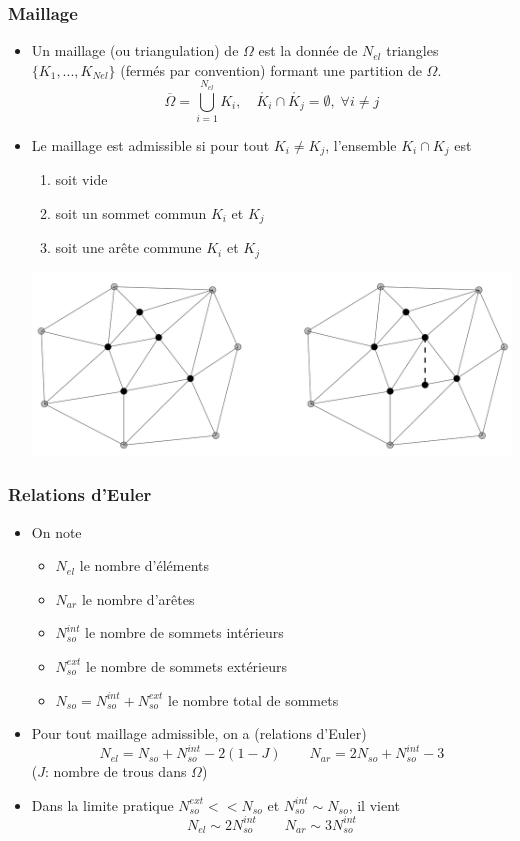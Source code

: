 \documentclass{beamer}
\begin{document}
\begin{frame}
\frametitle{Maillage }
\begin{itemize}
\item Un maillage (ou triangulation) de $\Omega$ est la donnée de $N_{el}$ triangles
$\{K_1, . . .,K_{Nel}\}$ (fermés par convention) formant une partition de $\Omega$.
\[\overline{\Omega}=\bigcup_{i=1}^{N_{el}}K_i,\quad \mathring{K_i}\cap \mathring{K_j}=\emptyset,\; \forall i\neq j\]

\item Le maillage est admissible si pour tout $K_i \neq K_j$, l'ensemble $K_i \cap K_j$ est
\begin{enumerate}
\item soit vide
\item soit un sommet commun $K_i$ et $K_j$
\item soit une arête commune $K_i$ et $K_j$
\end{enumerate}
\begin{center}
\includegraphics[scale=0.25]{maillage01.png} 
\end{center}
\end{itemize}
\end{frame}

\begin{frame}
\frametitle{Relations d'Euler}
\begin{itemize}
\item On note
\begin{itemize}
\item $N_{el}$ le nombre d'éléments
\item $N_{ar}$ le nombre d'arêtes
\item $N_{so}^{int}$  le nombre de sommets intérieurs
\item $N_{so}^{ext}$  le nombre de sommets extérieurs
\item $N_{so}=N_{so}^{int}+N_{so}^{ext}$  le nombre total de sommets
\end{itemize}

\item Pour tout maillage admissible, on a (relations d'Euler)
\[N_{el}=N_{so}+N_{so}^{int}-2(1-J)\qquad N_{ar}=2N_{so}+N_{so}^{int}-3\]
($J$: nombre de trous dans $\Omega$)
\item Dans la limite pratique $N_{so}^{ext}<< N_{so}$ et $N_{so}^{int}\sim N_{so}$, il vient
\[N_{el}\sim 2N_{so}^{int} \qquad N_{ar}\sim 3N_{so}^{int} \]
\end{itemize}
\end{frame}
\end{document}
